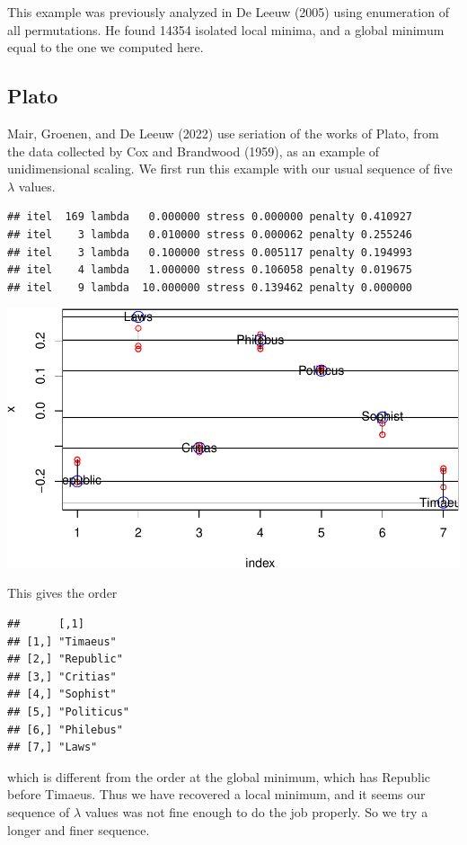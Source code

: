\documentclass[
  12pt,
]{article}
\begin{document}
This example was previously analyzed in De Leeuw (2005) using
enumeration of all permutations. He found 14354 isolated local minima,
and a global minimum equal to the one we computed here.

\subsection{Plato}\label{plato}

Mair, Groenen, and De Leeuw (2022) use seriation of the works of Plato,
from the data collected by Cox and Brandwood (1959), as an example of
unidimensional scaling. We first run this example with our usual
sequence of five \(\lambda\) values.

\begin{verbatim}
## itel  169 lambda   0.000000 stress 0.000000 penalty 0.410927 
## itel    3 lambda   0.010000 stress 0.000062 penalty 0.255246 
## itel    3 lambda   0.100000 stress 0.005117 penalty 0.194993 
## itel    4 lambda   1.000000 stress 0.106058 penalty 0.019675 
## itel    9 lambda  10.000000 stress 0.139462 penalty 0.000000
\end{verbatim}

\begin{center}\includegraphics{penalty_files/figure-latex/plato-1} \end{center}

This gives the order

\begin{verbatim}
##      [,1]       
## [1,] "Timaeus"  
## [2,] "Republic" 
## [3,] "Critias"  
## [4,] "Sophist"  
## [5,] "Politicus"
## [6,] "Philebus" 
## [7,] "Laws"
\end{verbatim}

which is different from the order at the global minimum, which has
Republic before Timaeus. Thus we have recovered a local minimum, and it
seems our sequence of \(\lambda\) values was not fine enough to do the
job properly. So we try a longer and finer sequence.
\end{document}
